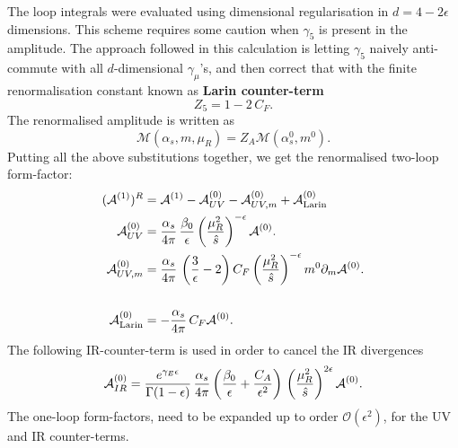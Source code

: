 \par  The loop integrals were evaluated using dimensional regularisation in $d= 4-2\epsilon$ dimensions. This scheme requires some caution when $\gamma_5$ is present in the amplitude. The approach followed in this calculation is letting $\gamma_5$ naively anti-commute with all $d$-dimensional $\gamma_\mu$'s, and then correct that with the finite renormalisation constant known as \textbf{Larin counter-term}~\cite{Larin:1993tq}
\begin{equation}
	Z_5 = 1- 2\, C_F.
\end{equation}
The renormalised amplitude is written as
\begin{equation}
	\mathcal M  (\alpha_s, m, \mu_R) = Z_A \mathcal M( \alpha_s^0, m^0).
\end{equation}
Putting all the above substitutions together, we get the renormalised two-loop form-factor:
\begin{align}
	( \mathcal A ^{(1)})^R &= 	\mathcal A ^{(1)} -	\mathcal A_{UV} ^{(0)}- 	\mathcal A_{UV, m} ^{(0)} + \mathcal A_{\text{Larin}} ^{(0)}   \\
	\mathcal A_{UV} ^{(0)} &= \frac{\alpha_s}{4 \pi}\,\frac{\beta_0}{\epsilon} \left( \frac{\mu_R^2}{\hat s} \right) ^{ -\epsilon} 	\mathcal A ^{(0)}.  \nonumber \\
	\mathcal A_{UV, m} ^{(0)} &= \frac{\alpha_s}{4 \pi} \, \left( \frac{3}{\epsilon} -2\right) C_F \left( \frac{\mu_R^2}{\hat s} \right) ^{ -\epsilon} m^0 \partial_m \mathcal A^{(0)} . \nonumber \\
	\\
	\mathcal	A_{\text{Larin}} ^{(0)}  &= - \frac{\alpha_s}{4 \pi} \, C_F  \mathcal A ^{(0)} .\nonumber
\end{align}
The following IR-counter-term is used in order to cancel the IR divergences
\begin{equation}
	\mathcal A_{IR} ^{(0)}  = \frac{e^{\gamma_E \epsilon}}{\Gamma(1-\epsilon)} \, \frac{\alpha_s}{4 \pi} \left( \frac{\beta_0}{\epsilon} + \frac{ C_A}{\epsilon^2} \right)  \, \left(  \frac{\mu_R^2}{\hat s}\right) ^{2\epsilon} \mathcal A ^{(0)}.
\end{equation}
The one-loop form-factors, need to be expanded up to order $ \mathcal O(\epsilon^2) $, for the UV and IR counter-terms.
